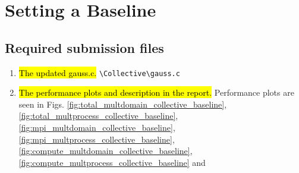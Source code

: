
\section{Setting a Baseline}
\subsection{Required submission files}
\begin{enumerate}
	\item \hl{The updated gauss.c.}
	\verb!\Collective\gauss.c!
	

	\item \hl{The performance plots and description in the report.}
	Performance plots are seen in Figs. \ref{fig:total_multdomain_collective_baseline}, \ref{fig:total_multprocess_collective_baseline}, \ref{fig:mpi_multdomain_collective_baseline},
	\ref{fig:mpi_multprocess_collective_baseline}, \ref{fig:compute_multdomain_collective_baseline},
	\ref{fig:compute_multprocess_collective_baseline} and 

\end{enumerate}

